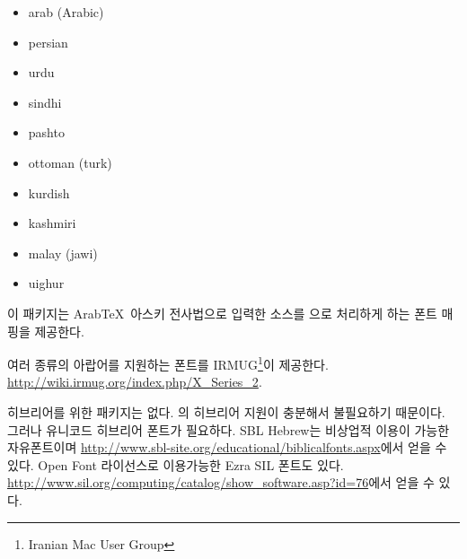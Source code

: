 \begin{itemize} \tightlist
\item arab (Arabic)
\item persian
\item urdu
\item sindhi
\item pashto
\item ottoman (turk)
\item kurdish
\item kashmiri
\item malay (jawi)
\item uighur
\end{itemize}

이 패키지는 Arab\TeX\ 아스키 전사법으로 입력한 소스를 으로 처리하게 하는 폰트 매핑을 제공한다.

여러 종류의 아랍어를 지원하는 폰트를 IRMUG\footnote{Iranian Mac User Group}이 제공한다.
\url{http://wiki.irmug.org/index.php/X_Series_2}.

히브리어를 위한 패키지는 없다. 의 히브리어 지원이 충분해서
불필요하기 때문이다. 그러나 유니코드 히브리어 폰트가 필요하다. SBL Hebrew는 비상업적 이용이 가능한 
자유폰트이며 \url{http://www.sbl-site.org/educational/biblicalfonts.aspx}에서 얻을 수 있다.
Open Font 라이선스로 이용가능한 Ezra SIL 폰트도 있다. \url{http://www.sil.org/computing/catalog/show_software.asp?id=76}에서
얻을 수 있다.

